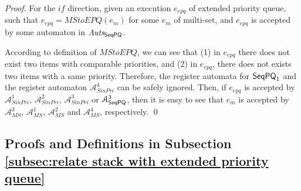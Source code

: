 {\begin {proof}
For the $\textit{if}$ direction, given an execution $e_{\textit{epq}}$ of extended priority queue, such that $e_{\textit{epq}} = \textit{MStoEPQ}(e_m)$ for some $e_m$ of multi-set, and $e_{\textit{epq}}$ is accepted by some automaton in $\textit{Auts}_{\mathsf{SeqPQ}}$.

According to definition of $\textit{MStoEPQ}$, we can see that (1) in $e_{\textit{epq}}$ there does not exist two items with comparable priorities, and (2) in $e_{\textit{epq}}$, there does not exists two items with a same priority. Therefore, the register automata for $\mathsf{SeqPQ}_1$ and the register automaton $\mathcal{A}_{\textit{SinPri}}^4$ can be safely ignored. Then, if $e_{\textit{epq}}$ is accepted by $\mathcal{A}_{\textit{SinPri}}^1$, $\mathcal{A}_{\textit{SinPri}}^2$, $\mathcal{A}_{\textit{SinPri}}^3$ or $\mathcal{A}_{\mathsf{SeqPQ}}^3$, then it is easy to see that $e_m$ is accepted by $\mathcal{A}_{\textit{MS}}^3$, $\mathcal{A}_{\textit{MS}}^1$, $\mathcal{A}_{\textit{MS}}^2$ and $\mathcal{A}_{\textit{MS}}^4$, respectively. \qed
\end {proof}



\subsection{Proofs and Definitions in Subsection \ref{subsec:relate stack with extended priority queue}}
\label{subsec:appendix proof and definition in section relate stack with extended priority queue}
}





